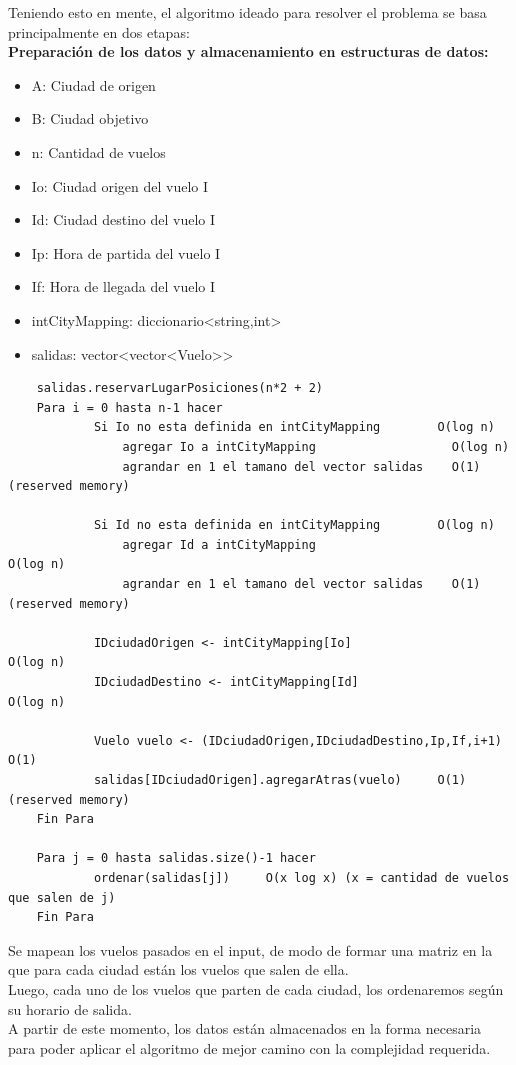 \documentclass[10pt,a4paper]{article}
\begin{document}
Teniendo esto en mente, el algoritmo ideado para resolver el problema se basa principalmente en dos etapas:\\

\textbf{Preparación de los datos y almacenamiento en estructuras de datos:}


\begin{itemize}
\item A: Ciudad de origen
\item B: Ciudad objetivo
\item n: Cantidad de vuelos
\item Io: Ciudad origen del vuelo I
\item Id: Ciudad destino del vuelo I
\item Ip: Hora de partida del vuelo I
\item If: Hora de llegada del vuelo I
\item intCityMapping: diccionario\textless string,int\textgreater
\item salidas: vector\textless vector\textless Vuelo\textgreater\textgreater \\
\end{itemize}
\begin{lstlisting}
	salidas.reservarLugarPosiciones(n*2 + 2)
	Para i = 0 hasta n-1 hacer
			Si Io no esta definida en intCityMapping        O(log n)
				agregar	Io a intCityMapping                   O(log n)	
				agrandar en 1 el tamano del vector salidas    O(1) (reserved memory)
				
			Si Id no esta definida en intCityMapping        O(log n)
				agregar	Id a intCityMapping				            O(log n)	
				agrandar en 1 el tamano del vector salidas    O(1) (reserved memory)	
		
			IDciudadOrigen <- intCityMapping[Io]				    O(log n)
			IDciudadDestino <- intCityMapping[Id]				    O(log n)			
			
			Vuelo vuelo <- (IDciudadOrigen,IDciudadDestino,Ip,If,i+1)	  O(1)		
			salidas[IDciudadOrigen].agregarAtras(vuelo)     O(1) (reserved memory)
	Fin Para	
			
	Para j = 0 hasta salidas.size()-1 hacer
			ordenar(salidas[j])		O(x log x) (x = cantidad de vuelos que salen de j)
	Fin Para
\end{lstlisting}

Se mapean los vuelos pasados en el input, de modo de formar una matriz en la que para cada ciudad están los vuelos que salen de ella.\\
Luego, cada uno de los vuelos que parten de cada ciudad, los ordenaremos según su horario de salida.\\
A partir de este momento, los datos están almacenados en la forma necesaria para poder aplicar el algoritmo de mejor camino con la complejidad requerida.\\\\
\newpage	
\end{document}
